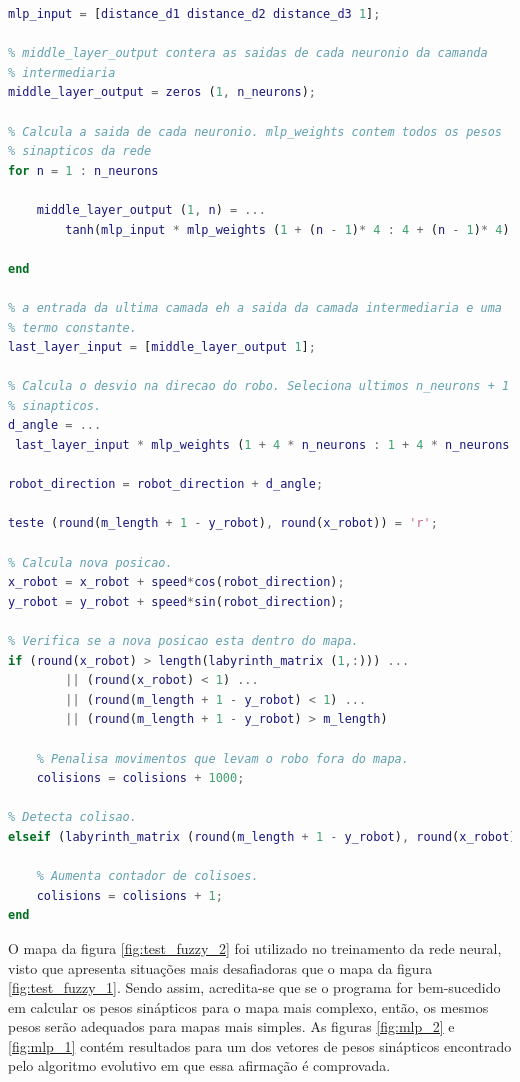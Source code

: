 \begin{lstlisting}[language=Matlab, caption={Trecho de código do controle do
robô feito via rede MLP.}, label={lst:control_mlp}] 
% Constroi vetor das entradas de cada neuronio
mlp_input = [distance_d1 distance_d2 distance_d3 1];

% middle_layer_output contera as saidas de cada neuronio da camanda
% intermediaria
middle_layer_output = zeros (1, n_neurons);

% Calcula a saida de cada neuronio. mlp_weights contem todos os pesos
% sinapticos da rede 
for n = 1 : n_neurons
    
    middle_layer_output (1, n) = ...
        tanh(mlp_input * mlp_weights (1 + (n - 1)* 4 : 4 + (n - 1)* 4)');
    
end

% a entrada da ultima camada eh a saida da camada intermediaria e uma
% termo constante.
last_layer_input = [middle_layer_output 1];

% Calcula o desvio na direcao do robo. Seleciona ultimos n_neurons + 1 pesos
% sinapticos. 
d_angle = ...
 last_layer_input * mlp_weights (1 + 4 * n_neurons : 1 + 4 * n_neurons + n_neurons)';

robot_direction = robot_direction + d_angle;

teste (round(m_length + 1 - y_robot), round(x_robot)) = 'r';

% Calcula nova posicao.
x_robot = x_robot + speed*cos(robot_direction);
y_robot = y_robot + speed*sin(robot_direction);

% Verifica se a nova posicao esta dentro do mapa.
if (round(x_robot) > length(labyrinth_matrix (1,:))) ...
        || (round(x_robot) < 1) ...
        || (round(m_length + 1 - y_robot) < 1) ...
        || (round(m_length + 1 - y_robot) > m_length)
    
    % Penalisa movimentos que levam o robo fora do mapa.
    colisions = colisions + 1000;
    
% Detecta colisao.
elseif (labyrinth_matrix (round(m_length + 1 - y_robot), round(x_robot)) == '#')
    
    % Aumenta contador de colisoes.
    colisions = colisions + 1;
end
\end{lstlisting}
	
O mapa da figura \ref{fig:test_fuzzy_2} foi utilizado no treinamento da rede
neural, visto que apresenta situações mais desafiadoras que o mapa da figura
\ref{fig:test_fuzzy_1}. Sendo assim, acredita-se que se o programa for
bem-sucedido em calcular os pesos sinápticos para o mapa mais complexo, então,
os mesmos pesos serão adequados para mapas mais simples. As figuras
\ref{fig:mlp_2} e \ref{fig:mlp_1} contém resultados para um dos vetores de
pesos sinápticos encontrado pelo algoritmo evolutivo em que essa afirmação é
comprovada.


